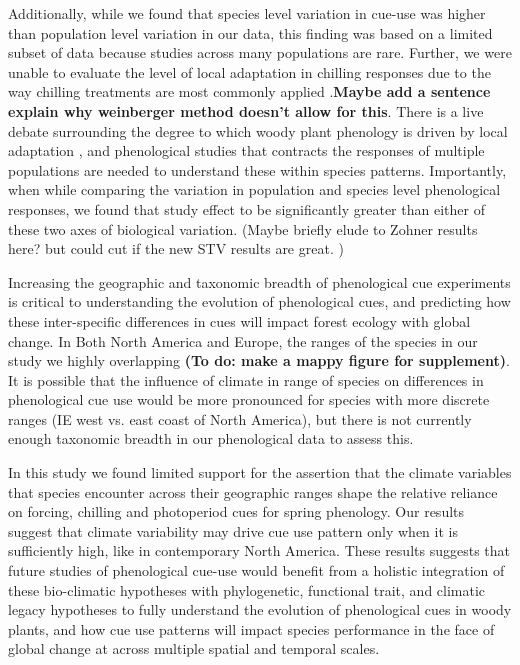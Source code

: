 \documentclass[12pt]{article}\usepackage[]{graphicx}\usepackage[]{color}
\begin{document}
\noindent Additionally, while we found that species level variation in cue-use was higher than population level variation in our data, this finding was based on a limited subset of data because studies across many populations are rare. Further, we were unable to evaluate the level of local adaptation in chilling responses due to the way chilling treatments are most commonly applied \citep{}.\textbf{Maybe add a sentence explain why weinberger method doesn't allow for this}. There is a live debate surrounding the degree to which woody plant phenology is driven by local adaptation \citep{}, and phenological studies that contracts the responses of multiple populations are needed to understand these within species patterns. Importantly, when while comparing the variation in population and species level phenological responses, we found that  study effect to be significantly greater than either of these two axes of biological variation. (Maybe briefly elude to Zohner results here? but could cut if the new STV results are great. )

Increasing the geographic and taxonomic breadth of phenological cue experiments is critical to understanding the evolution of phenological cues, and predicting how these inter-specific differences in cues will impact forest ecology with global change. In Both North America and Europe, the ranges of the species in our study we highly overlapping \textbf{(To do: make a mappy figure for supplement)}. It is possible that the influence of climate in range of species on differences in phenological cue use would be more pronounced for species with more discrete ranges (IE west vs. east coast of North America), but there is not currently enough taxonomic breadth in our phenological data to assess this. 

In this study we found limited support for the assertion that the climate variables that species encounter across their geographic ranges shape the relative reliance on forcing, chilling and photoperiod cues for spring phenology. Our results suggest that climate variability may drive cue use pattern only when it is sufficiently high, like in contemporary North America. These results suggests that future studies of phenological cue-use would benefit from a holistic integration of these bio-climatic hypotheses with phylogenetic, functional trait, and climatic legacy hypotheses to fully understand the evolution of phenological cues in woody plants, and how cue use patterns will impact species performance in the face of global change at across multiple spatial and temporal scales.
\end{document}
